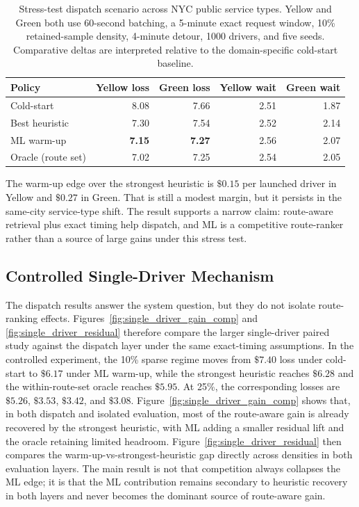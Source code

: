 \documentclass[journal]{IEEEtran}
\begin{document}
\begin{table}[!t]
\caption{Stress-test dispatch scenario across NYC public service types. Yellow and Green both use 60-second batching, a 5-minute exact request window, 10\% retained-sample density, 4-minute detour, 1000 drivers, and five seeds. Comparative deltas are interpreted relative to the domain-specific cold-start baseline.}
\label{tab:domain_transfer}
\centering
\scriptsize
\setlength{\tabcolsep}{2.4pt}
\begin{tabular}{|l|r|r|r|r|}
\hline
Policy & Yellow loss & Green loss & Yellow wait & Green wait \\
\hline
Cold-start & 8.08 & 7.66 & 2.51 & 1.87 \\
\hline
Best heuristic & 7.30 & 7.54 & 2.52 & 2.14 \\
\hline
ML warm-up & \textbf{7.15} & \textbf{7.27} & 2.56 & 2.07 \\
\hline
Oracle (route set) & 7.02 & 7.25 & 2.54 & 2.05 \\
\hline
\end{tabular}
\end{table}

The warm-up edge over the strongest heuristic is \(\$0.15\) per launched driver in Yellow and \(\$0.27\) in Green. That is still a modest margin, but it persists in the same-city service-type shift. The result supports a narrow claim: route-aware retrieval plus exact timing help dispatch, and ML is a competitive route-ranker rather than a source of large gains under this stress test.

\subsection{Controlled Single-Driver Mechanism}
The dispatch results answer the system question, but they do not isolate route-ranking effects. Figures~\ref{fig:single_driver_gain_comp} and \ref{fig:single_driver_residual} therefore compare the larger single-driver paired study against the dispatch layer under the same exact-timing assumptions. In the controlled experiment, the 10\% sparse regime moves from \(\$7.40\) loss under cold-start to \(\$6.17\) under ML warm-up, while the strongest heuristic reaches \(\$6.28\) and the within-route-set oracle reaches \(\$5.95\). At 25\%, the corresponding losses are \(\$5.26\), \(\$3.53\), \(\$3.42\), and \(\$3.08\). Figure~\ref{fig:single_driver_gain_comp} shows that, in both dispatch and isolated evaluation, most of the route-aware gain is already recovered by the strongest heuristic, with ML adding a smaller residual lift and the oracle retaining limited headroom. Figure~\ref{fig:single_driver_residual} then compares the warm-up-vs-strongest-heuristic gap directly across densities in both evaluation layers. The main result is not that competition always collapses the ML edge; it is that the ML contribution remains secondary to heuristic recovery in both layers and never becomes the dominant source of route-aware gain.
\end{document}
